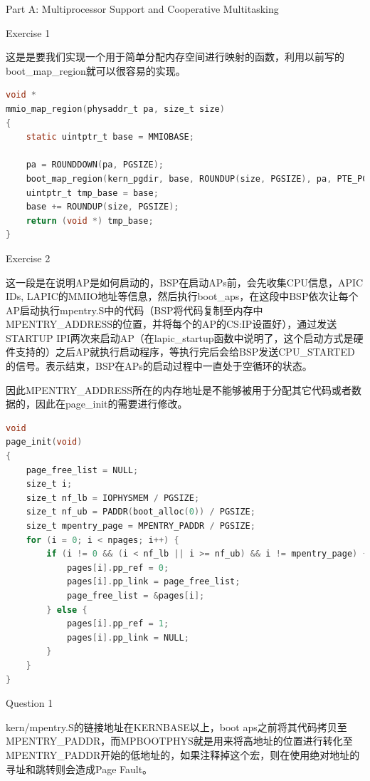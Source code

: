 \documentclass[GBK,winfonts,a4paper,10pt]{ctexart}
\begin{document}
\begin{section}{Part A: Multiprocessor Support and Cooperative Multitasking}
\begin{subsection}{Exercise 1}
\par
这是是要我们实现一个用于简单分配内存空间进行映射的函数，利用以前写的boot\_map\_region就可以很容易的实现。
\begin{lstlisting}[language=C]
void *
mmio_map_region(physaddr_t pa, size_t size)
{
	static uintptr_t base = MMIOBASE;

	pa = ROUNDDOWN(pa, PGSIZE);
	boot_map_region(kern_pgdir, base, ROUNDUP(size, PGSIZE), pa, PTE_PCD | PTE_PWT | PTE_W);
	uintptr_t tmp_base = base;
	base += ROUNDUP(size, PGSIZE);
	return (void *) tmp_base;
}
\end{lstlisting}
\end{subsection}

\begin{subsection}{Exercise 2}
\par
这一段是在说明AP是如何启动的，BSP在启动APs前，会先收集CPU信息，APIC IDs, LAPIC的MMIO地址等信息，然后执行boot\_aps，在这段中BSP依次让每个AP启动执行mpentry.S中的代码（BSP将代码复制至内存中MPENTRY\_ADDRESS的位置，并将每个的AP的CS:IP设置好），通过发送STARTUP IPI两次来启动AP（在lapic\_startup函数中说明了，这个启动方式是硬件支持的）之后AP就执行启动程序，等执行完后会给BSP发送CPU\_STARTED的信号。表示结束，BSP在APs的启动过程中一直处于空循环的状态。
\par
因此MPENTRY\_ADDRESS所在的内存地址是不能够被用于分配其它代码或者数据的，因此在page\_init的需要进行修改。
\begin{lstlisting}[language=C]
void
page_init(void)
{
    page_free_list = NULL;
    size_t i;
	size_t nf_lb = IOPHYSMEM / PGSIZE;
    size_t nf_ub = PADDR(boot_alloc(0)) / PGSIZE;
    size_t mpentry_page = MPENTRY_PADDR / PGSIZE;
    for (i = 0; i < npages; i++) {
        if (i != 0 && (i < nf_lb || i >= nf_ub) && i != mpentry_page) {
		    pages[i].pp_ref = 0;
            pages[i].pp_link = page_free_list;
		    page_free_list = &pages[i];
        } else {
            pages[i].pp_ref = 1;
            pages[i].pp_link = NULL;
        }
	}
}
\end{lstlisting}
\end{subsection}

\begin{subsection}{Question 1}
\par
kern/mpentry.S的链接地址在KERNBASE以上，boot aps之前将其代码拷贝至MPENTRY\_PADDR，而MPBOOTPHYS就是用来将高地址的位置进行转化至MPENTRY\_PADDR开始的低地址的，如果注释掉这个宏，则在使用绝对地址的寻址和跳转则会造成Page Fault。
\end{subsection}


\end{section}
\end{document}
